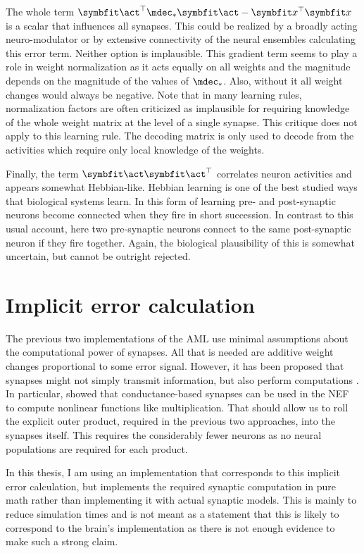 The whole term $\vc\act\Tr \mdec_* \vc\act - \vc x\Tr \vc x$ is a scalar that influences all synapses.
This could be realized by a broadly acting neuro-modulator or by extensive connectivity of the neural ensembles calculating this error term.
Neither option is implausible.
This gradient term seems to play a role in weight normalization as it acts equally on all weights and the magnitude depends on the magnitude of the values of $\mdec_*$.
Also, without it all weight changes would always be negative.
Note that in many learning rules, normalization factors are often criticized as implausible for requiring knowledge of the whole weight matrix at the level of a single synapse.
This critique does not apply to this learning rule.
The decoding matrix is only used to decode from the activities which require only local knowledge of the weights.

Finally, the term $\vc\act \vc\act\Tr$ correlates neuron activities and appears somewhat Hebbian-like.
Hebbian learning is one of the best studied ways that biological systems learn.
In this form of learning pre- and post-synaptic neurons become connected when they fire in short succession.
In contrast to this usual account, here two pre-synaptic neurons connect to the same post-synaptic neuron if they fire together.
Again, the biological plausibility of this is somewhat uncertain, but cannot be outright rejected.


\section{Implicit error calculation}
The previous two implementations of the AML use minimal assumptions about the computational power of synapses.
All that is needed are additive weight changes proportional to some error signal.
However, it has been proposed that synapses might not simply transmit information, but also perform computations \parencites{abbott2004}[Ch.~5]{koch2004}.
In particular, \textcite{andreasstockel2018} showed that conductance-based synapses can be used in the NEF to compute nonlinear functions like multiplication.
That should allow us to roll the explicit outer product, required in the previous two approaches, into the synapses itself.
This requires the considerably fewer neurons as no neural populations are required for each product.

In this thesis, I am using an implementation that corresponds to this implicit error calculation, but implements the required synaptic computation in pure math rather than implementing it with actual synaptic models.
This is mainly to reduce simulation times and is not meant as a statement that this is likely to correspond to the brain's implementation as there is not enough evidence to make such a strong claim.


